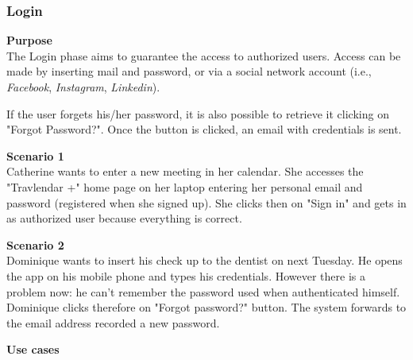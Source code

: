 \documentclass{article}
\begin{document}
	\newpage
	\subsubsection{Login}
	
	\bigskip
	\noindent
	\textbf{Purpose} \\
	The Login phase aims to guarantee the access to authorized users. Access can be made by inserting mail and password, or via a social network account (i.e., \textit{Facebook}, \textit{Instagram}, \textit{Linkedin}).
	
	If the user forgets his/her password, it is also possible to retrieve it clicking on "Forgot Password?". Once the button is clicked, an email with credentials is sent.


	\bigskip
	\noindent
	\textbf{Scenario 1} \\
	Catherine wants to enter a new meeting in her calendar. She accesses the "Travlendar +" home page on her laptop entering her personal email and password (registered when she signed up). She clicks then on "Sign in" and gets in as authorized user because everything is correct.
	
	\bigskip
	\noindent
	\textbf{Scenario 2} \\
	Dominique wants to insert his check up to the dentist on next Tuesday. He opens the app on his mobile phone and types his credentials. However there is a problem now: he can't remember the password used when authenticated himself. Dominique clicks therefore on "Forgot password?" button. The system forwards to the email address recorded a new password.
	
	\bigskip
	\noindent
	\textbf{Use cases} \\
	
\end{document}
